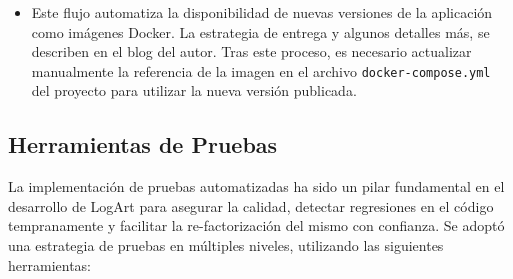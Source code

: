 \begin{itemize}
\begin{itemize}
\begin{enumerate}
                    \end{enumerate}
                \item Este flujo automatiza la disponibilidad de nuevas versiones de la aplicación como imágenes Docker. La estrategia de entrega y algunos detalles más, se describen en el blog del autor\cite{MorenoCDLogArt}. Tras este proceso, es necesario actualizar manualmente la referencia de la imagen en el archivo \texttt{docker-compose.yml} del proyecto para utilizar la nueva versión publicada.
            \end{itemize}
    \end{itemize}

\subsection{Herramientas de Pruebas}
\label{sec:herramientasPruebas}

La implementación de pruebas automatizadas ha sido un pilar fundamental en el desarrollo de LogArt para asegurar la calidad, detectar regresiones en el código tempranamente y facilitar la re-factorización del mismo con confianza. Se adoptó una estrategia de pruebas en múltiples niveles, utilizando las siguientes herramientas:

